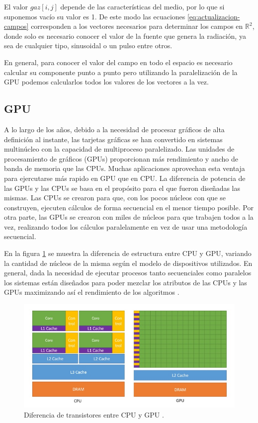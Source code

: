 \documentclass[11pt,a4paper,twoside,pdf]{article}
\numberwithin{equation}{section}
\begin{document}
El valor $gaz[i,j]$ depende de las características del medio, por lo que si suponemos vacío su valor es 1. De este modo las ecuaciones \eqref{eq:actualizacion-campos} corresponden a los vectores necesarios para determinar los campos en $\mathbb R^{2}$, donde solo es necesario conocer el valor de la fuente que genera la radiación, ya sea de cualquier tipo, sinusoidal o un pulso entre otros.  

En general, para conocer el valor del campo en todo el espacio es necesario calcular  su componente punto a punto pero utilizando la paralelización de la GPU podemos calcularlos todos los valores de los vectores a la vez.



\subsection{GPU} \label{subsection:GPU}

A lo largo de los años, debido a la necesidad de procesar gráficos de alta definición al instante, las tarjetas gráficas se han convertido en sistemas multinúcleo con la capacidad de multiproceso paralelizado. Las unidades de procesamiento de gráficos (GPUs) proporcionan más rendimiento y ancho de banda de memoria que las CPUs. Muchas aplicaciones aprovechan esta ventaja para ejercutarse más rapido en GPU que en CPU. La diferencia de potencia de las GPUs y las CPUs se basa en el propósito para el que fueron diseñadas las mismas. Las CPUs se crearon para que, con los pocos núcleos con que se construyen, ejecuten cálculos de forma secuencial en el menor tiempo posible. Por otra parte, las GPUs se crearon con miles de núcleos para que trabajen todos a la vez, realizando todos los cálculos paralelamente en vez de usar una metodología secuencial.

En la figura \ref{fig:arquitectura-cpu-gpu} se muestra la diferencia de estructura entre CPU y GPU, variando la cantidad de núcleos de la misma según el modelo de dispositivos utilizados. En general, dada la necesidad de ejecutar procesos tanto secuenciales como paralelos los sistemas están diseñados para poder mezclar los atributos de las CPUs y las GPUs maximizando así el rendimiento de los algoritmos \cite{web}.

\begin{figure}[h]
\centering
\includegraphics[width=15cm]{Nvidia-CPU-GPU.jpg}				
\caption{Diferencia de transistores entre CPU y GPU \cite{web}. }
\label{fig:arquitectura-cpu-gpu}
\end{figure}
\noindent
\end{document}
